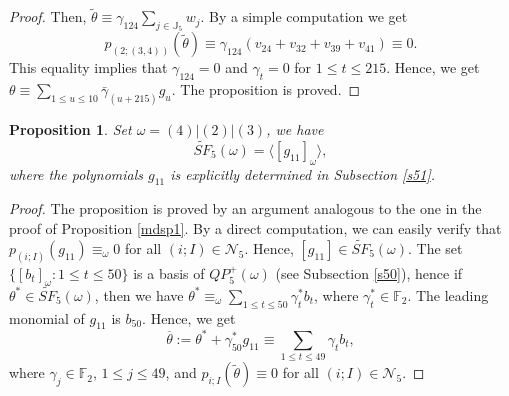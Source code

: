 \documentclass[reqno]{amsart}
\theoremstyle{plain}
\theoremstyle{definition}
\theoremstyle{plain}
\newtheorem{props}[thms]{Proposition}
\theoremstyle{definition}
\numberwithin{equation}{section}
\begin{document}
\begin{proof}
Then, $\widetilde \theta \equiv \gamma_{124}\sum_{j\in \mathbb J_5}w_j$. By a simple computation we get
$$p_{(2;(3,4))}(\widetilde \theta) \equiv \gamma_{124}(v_{24} + v_{32} + v_{39} + v_{41}) \equiv 0.$$
This equality implies that $\gamma_{124} =0$ and $\gamma_t = 0$ for $1 \leqslant t \leqslant 215$. Hence, we get $\theta \equiv \sum_{1\leqslant u \leqslant 10}\bar\gamma_{(u+215)}g_u$. The proposition is proved.
\end{proof}

\begin{props}\label{mdp2} Set $\omega = (4)|(2)|(3)$, we have 
$$\widetilde{SF}_5({\omega}) = \langle [g_{11}]_\omega\rangle,$$
where the polynomials $g_{11}$ is explicitly determined in Subsection \ref{s51}.
\end{props}
\begin{proof} The proposition is proved by an argument analogous to the one in the proof of Proposition \ref{mdsp1}.
By a direct computation, we can easily verify that $p_{(i;I)}(g_{11}) \equiv_\omega 0$ for all $(i;I)\in \mathcal N_5$. Hence, $[g_{11}] \in \widetilde{SF}_5{(\omega)}$.
The set $\{[b_t]_\omega :1\leqslant t \leqslant 50\}$ is a basis of  $QP_5^+(\omega)$ (see Subsection \ref{s50}), hence if $\theta^* \in \widetilde {SF}_{5}(\omega)$, then we have $\theta^* \equiv_\omega \sum_{1\leqslant t \leqslant 50}\gamma_t^*b_{t}$, where $\gamma_t^* \in \mathbb F_2$. The leading monomial of $g_{11}$ is $b_{50}$. Hence, we get 
\begin{equation}\label{dtd612}
\overline{\theta} := \theta^* + \gamma_{50}^*g_{11}\equiv \sum_{1\leqslant t \leqslant 49}\gamma_tb_{t},
\end{equation}
where $\gamma_j \in \mathbb F_2$, $1\leqslant j \leqslant 49$, and $p_{i;I}(\widetilde\theta) \equiv 0$ for all $(i;I) \in \mathcal N_5$. 


\end{proof}
\end{document}
